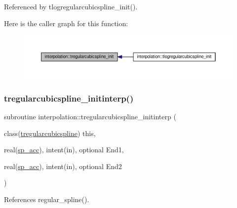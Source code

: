 Referenced by tlogregularcubicspline\+\_\+init().

Here is the caller graph for this function\+:
\nopagebreak
\begin{figure}[H]
\begin{center}
\leavevmode
\includegraphics[width=350pt]{namespaceinterpolation_ad48c755482d305cc69ce002d8d57eb5e_icgraph}
\end{center}
\end{figure}
\mbox{\label{namespaceinterpolation_a771257f70f21fe027a53de95c8e6454d}} 
\subsubsection{\texorpdfstring{tregularcubicspline\+\_\+initinterp()}{tregularcubicspline\_initinterp()}}
{\footnotesize\ttfamily subroutine interpolation\+::tregularcubicspline\+\_\+initinterp (\begin{DoxyParamCaption}\item[{class(\mbox{\hyperlink{structinterpolation_1_1tregularcubicspline}{tregularcubicspline}})}]{this,  }\item[{real(\mbox{\hyperlink{namespaceinterpolation_af72aa9a05feb8ef90b2d26e4a013abf3}{sp\+\_\+acc}}), intent(in), optional}]{End1,  }\item[{real(\mbox{\hyperlink{namespaceinterpolation_af72aa9a05feb8ef90b2d26e4a013abf3}{sp\+\_\+acc}}), intent(in), optional}]{End2 }\end{DoxyParamCaption})}



References regular\+\_\+spline().

